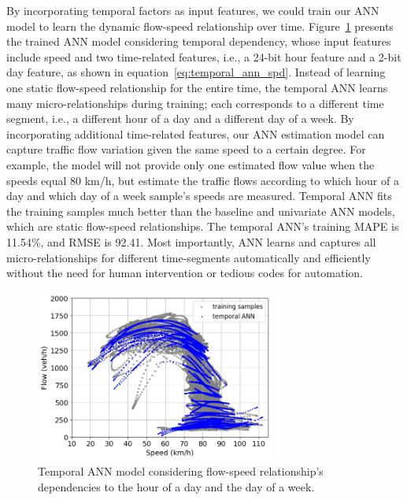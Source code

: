 \documentclass[english]{kththesis}
\begin{document}
By incorporating temporal factors as input features, we could train our ANN model to learn the dynamic flow-speed relationship over time. Figure~\ref{fig:temporal_ann_training} presents the trained ANN model considering temporal dependency, whose input features include speed and two time-related features, i.e., a 24-bit hour feature and a 2-bit day feature, as shown in equation~\ref{eq:temporal_ann_spd}. Instead of learning one static flow-speed relationship for the entire time, the temporal ANN learns many micro-relationships during training; each corresponds to a different time segment, i.e., a different hour of a day and a different day of a week. By incorporating additional time-related features, our ANN estimation model can capture traffic flow variation given the same speed to a certain degree. For example, the model will not provide only one estimated flow value when the speeds equal 80 km/h, but estimate the traffic flows according to which hour of a day and which day of a week sample's speeds are measured. Temporal ANN fits the training samples much better than the baseline and univariate ANN models, which are static flow-speed relationships. The temporal ANN's training MAPE is 11.54\%, and RMSE is 92.41. Most importantly, ANN learns and captures all micro-relationships for different time-segments automatically and efficiently without the need for human intervention or tedious codes for automation.

\begin{figure}[!ht]
    \centering
    \includegraphics[width=0.7\textwidth]{temporal_ann_training.png}
    \caption{Temporal ANN model considering flow-speed relationship's dependencies to the hour of a day and the day of a week.}
    \label{fig:temporal_ann_training}
\end{figure}
\end{document}

